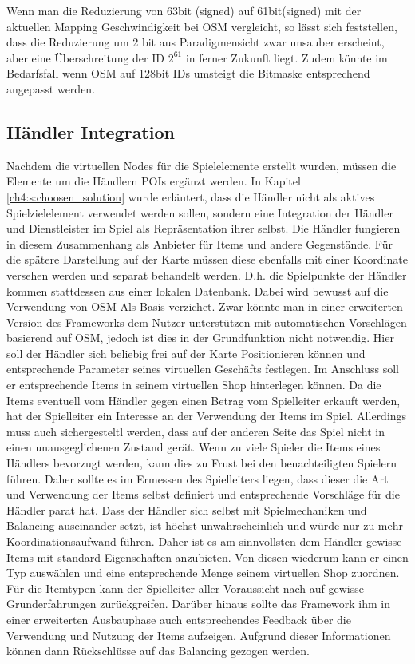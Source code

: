 Wenn man die Reduzierung von 63bit (signed) auf 61bit(signed) mit der aktuellen Mapping Geschwindigkeit bei OSM vergleicht, so lässt sich feststellen, dass die Reduzierung um 2 bit aus Paradigmensicht zwar unsauber erscheint, aber eine Überschreitung der ID \begin{math}2^{61}\end{math} in ferner Zukunft liegt. Zudem könnte im Bedarfsfall wenn OSM auf 128bit IDs umsteigt die Bitmaske entsprechend angepasst werden.

\subsection*{Händler Integration}

Nachdem die virtuellen Nodes für die Spielelemente erstellt wurden, müssen die Elemente um die Händlern POIs ergänzt werden. In Kapitel \ref{ch4:s:choosen_solution} wurde erläutert, dass die Händler nicht als aktives Spielzielelement verwendet werden sollen, sondern eine Integration der Händler und Dienstleister im Spiel als Repräsentation ihrer selbst. Die Händler fungieren in diesem Zusammenhang als Anbieter für Items und andere Gegenstände. Für die spätere Darstellung auf der Karte müssen diese ebenfalls mit einer Koordinate versehen werden und separat behandelt werden. D.h. die Spielpunkte der Händler kommen stattdessen aus einer lokalen Datenbank. Dabei wird bewusst auf die Verwendung von OSM Als Basis verzichet. Zwar könnte man in einer erweiterten Version des Frameworks dem Nutzer unterstützen mit automatischen Vorschlägen basierend auf OSM, jedoch ist dies in der Grundfunktion nicht notwendig. Hier soll der Händler sich beliebig frei auf der Karte Positionieren können und entsprechende Parameter seines virtuellen Geschäfts festlegen. Im Anschluss soll er entsprechende Items in seinem virtuellen Shop hinterlegen können. Da die Items eventuell vom Händler gegen einen Betrag vom Spielleiter erkauft werden, hat der Spielleiter ein  Interesse an der Verwendung der Items im Spiel. Allerdings muss auch sichergesteltl werden, dass auf der anderen Seite das Spiel nicht in einen unausgeglichenen Zustand gerät. Wenn zu viele Spieler die Items eines Händlers bevorzugt werden, kann dies zu Frust bei den benachteiligten Spielern führen. Daher sollte es im Ermessen des Spielleiters liegen, dass dieser die Art und Verwendung der Items selbst definiert und entsprechende Vorschläge für die Händler parat hat. Dass der Händler sich selbst mit Spielmechaniken und Balancing auseinander setzt, ist höchst unwahrscheinlich und würde nur zu mehr Koordinationsaufwand führen. Daher ist es am sinnvollsten dem Händler gewisse Items mit standard Eigenschaften anzubieten. Von diesen wiederum kann er einen Typ auswählen und eine entsprechende Menge seinem virtuellen Shop zuordnen.
Für die Itemtypen kann der Spielleiter aller Voraussicht nach auf gewisse Grunderfahrungen zurückgreifen. Darüber hinaus sollte das Framework ihm in einer erweiterten Ausbauphase auch entsprechendes Feedback über die Verwendung und Nutzung der Items aufzeigen. Aufgrund dieser Informationen können dann Rückschlüsse auf das Balancing gezogen werden.

